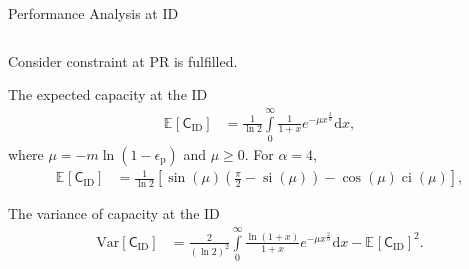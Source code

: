 \documentclass[12pt]{beamer}
\newcommand{\e}[2]{{\mathbb E}_{#1} {\left[ #2 \right]}}
\newcommand{\fs}[1]{\fontsize{ #1 pt}{8.2}\selectfont}
\newcommand{\sub}[1]{_{\text{#1}}}
\DeclareMathOperator*{\cosi}{ci}
\DeclareMathOperator*{\sini}{si}
\begin{document}
\begin{frame}[t]{Performance Analysis at ID}
\vspace{-0.2cm}
\begin{columns}
        \begin{column}{0.55\paperwidth}
        \begin{overlayarea}{\textwidth}{7.4cm}
	\fs{8}
	\begin{itemize}
	\item Consider constraint at PR is fulfilled.
	\only<2->
	{
		\item The expected capacity at the ID 
		\normalfont
		\begin{align*}
			\e{}{\mathsf{C}_{\text{ID}}} &= \frac{1}{\ln 2} \int\limits_{0}^{\infty} \frac{1}{1+ x} e^{-\mu x^{\frac{2}{\alpha}}} \text{d}x, 
		\end{align*}
		where  $\mu = - m \ln \left({1 - \epsilon{\sub{p}}}\right)$ and $\mu \ge 0$. \newline
		For $\alpha = 4$, 
		\begin{align*} 
			\e{}{\mathsf{C}_{\text{ID}}} &= \frac{1}{\ln 2} \left[ \sin(\mu) \left( \frac{\pi}{2} - \sini(\mu) \right) - \cos(\mu) \cosi(\mu) \right], \label{eq:Exp_Cap_4}  
		\end{align*}
	}
	{
		\item The variance of capacity at the ID
		\begin{align*}
			\text{Var} [ \mathsf{C}_{\text{ID}} ] &=  \frac{2}{(\ln 2)^2} \int\limits_{0}^{\infty} \frac{\ln(1 + x )}{1 + x} e^{-\mu x^{\frac{2}{\alpha}}} \text{d}x -  {\e{}{\mathsf{C}_{\text{ID}}} }^2. 
			\label{eq:var_cap}
		\end{align*}
	}
	\end{itemize}
	\end{overlayarea}
	\end{column}
        

\end{columns}
\end{frame}
\end{document}

